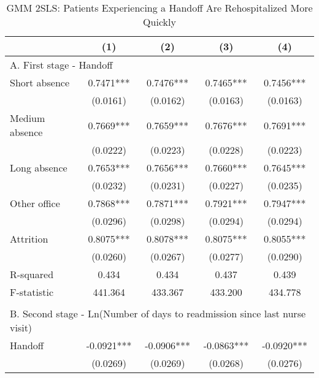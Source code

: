 \documentclass[final,12pt, notitlepage]{article}
\begin{document}
\begin{singlespace}
\begin{table}[H]
\footnotesize
\setlength\tabcolsep{0pt}
\centering
\caption{GMM 2SLS: Patients Experiencing a Handoff Are Rehospitalized More Quickly}
\label{tab:days2readmit_iv}
\begin{threeparttable}
{
\def\sym#1{\ifmmode^{#1}\else\(^{#1}\)\fi}
\begin{tabular*}{\textwidth}{l@{\extracolsep{\fill}}*{4}{c}} %
\toprule
                    &\multicolumn{1}{c}{(1)}&\multicolumn{1}{c}{(2)}&\multicolumn{1}{c}{(3)}&\multicolumn{1}{c}{(4)}\\
\midrule
\multicolumn{5}{l}{A. First stage - Handoff} \\
Short absence       &      0.7471***&      0.7476***&      0.7465***&      0.7456***\\
                    &    (0.0161)   &    (0.0162)   &    (0.0163)   &    (0.0163)   \\
Medium absence      &      0.7669***&      0.7659***&      0.7676***&      0.7691***\\
                    &    (0.0222)   &    (0.0223)   &    (0.0228)   &    (0.0223)   \\
Long absence        &      0.7653***&      0.7656***&      0.7660***&      0.7645***\\
                    &    (0.0232)   &    (0.0231)   &    (0.0227)   &    (0.0235)   \\
Other office        &      0.7868***&      0.7871***&      0.7921***&      0.7947***\\
                    &    (0.0296)   &    (0.0298)   &    (0.0294)   &    (0.0294)   \\
Attrition           &      0.8075***&      0.8078***&      0.8075***&      0.8055***\\
                    &    (0.0260)   &    (0.0267)   &    (0.0277)   &    (0.0290)   \\
R-squared           &       0.434   &       0.434   &       0.437   &       0.439   \\
F-statistic         &     441.364   &     433.367   &     433.200   &     434.778   \\
\\
\multicolumn{5}{l}{B. Second stage - Ln(Number of days to readmission since last nurse visit)} \\
Handoff             &     -0.0921***&     -0.0906***&     -0.0863***&     -0.0920***\\
                    &    (0.0269)   &    (0.0269)   &    (0.0268)   &    (0.0276)   \\

\end{tabular*}}
\end{threeparttable}
\end{table}
\end{singlespace}
\end{document}
